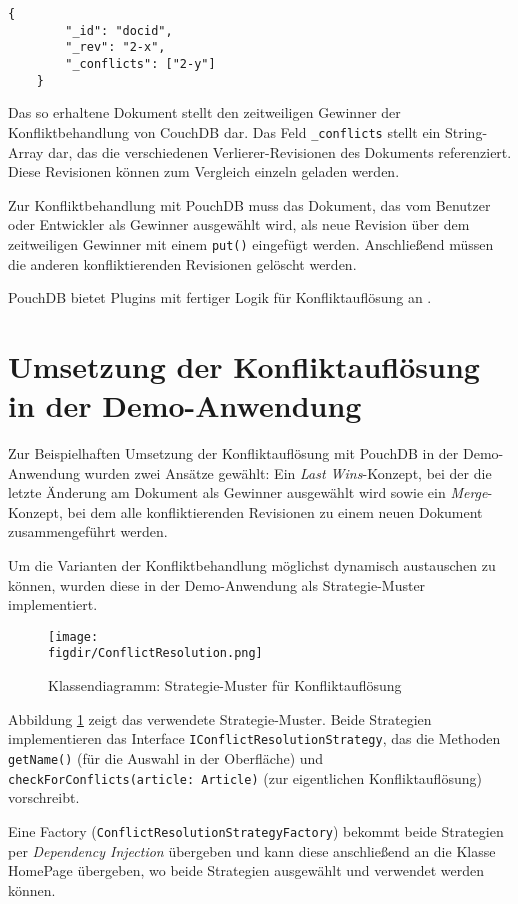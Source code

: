 \begin{codebox}
	\begin{lstlisting}[style=typescript]
	{
		"_id": "docid",
		"_rev": "2-x",
		"_conflicts": ["2-y"]
	}
	\end{lstlisting}
\end{codebox}

Das so erhaltene Dokument stellt den zeitweiligen Gewinner der Konfliktbehandlung von CouchDB dar.
Das Feld \texttt{\_conflicts} stellt ein String-Array dar, das die verschiedenen Verlierer-Revisionen des Dokuments referenziert. Diese Revisionen können zum Vergleich einzeln geladen werden.

Zur Konfliktbehandlung mit PouchDB muss das Dokument, das vom Benutzer oder Entwickler als Gewinner ausgewählt wird, als neue Revision über dem zeitweiligen Gewinner mit einem \texttt{put()} eingefügt werden. Anschließend müssen die anderen konfliktierenden Revisionen gelöscht werden.

PouchDB bietet Plugins mit fertiger Logik für Konfliktauflösung an \cite{pouch:conflicts}.

\section{Umsetzung der Konfliktauflösung in der Demo-Anwendung}

Zur Beispielhaften Umsetzung der Konfliktauflösung mit PouchDB in der Demo-Anwendung wurden zwei Ansätze gewählt: Ein \emph{Last Wins}-Konzept, bei der die letzte Änderung am Dokument als Gewinner ausgewählt wird sowie ein \emph{Merge}-Konzept, bei dem alle konfliktierenden Revisionen zu einem neuen Dokument zusammengeführt werden.

Um die Varianten der Konfliktbehandlung möglichst dynamisch austauschen zu können, wurden diese in der Demo-Anwendung als Strategie-Muster implementiert.

\begin{figure}[htb]
	\centering
	\caption{Klassendiagramm: Strategie-Muster für Konfliktauflösung}
	\label{fig:conflictresolutionstrategy}
	\texttt{[image: \\figdir/ConflictResolution.png]}
\end{figure}

Abbildung \ref{fig:conflictresolutionstrategy} zeigt das verwendete Strategie-Muster. Beide Strategien implementieren das Interface \texttt{IConflictResolutionStrategy}, das die Methoden \texttt{getName()} (für die Auswahl in der Oberfläche) und \texttt{checkForConflicts(article: Article)} (zur eigentlichen Konfliktauflösung) vorschreibt.

Eine Factory (\texttt{ConflictResolutionStrategyFactory}) bekommt beide Strategien per \emph{Dependency Injection} übergeben und kann diese anschließend an die Klasse HomePage übergeben, wo beide Strategien ausgewählt und verwendet werden können.